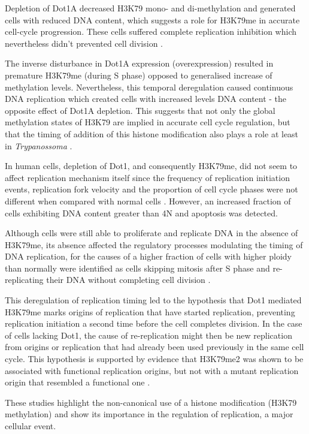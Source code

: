 \documentclass[11pt,twoside,a4paper]{report}
\begin{document}
		Depletion of Dot1A decreased H3K79 mono- and di-methylation and generated cells with reduced DNA content, which suggests a role for H3K79me in accurate cell-cycle progression. These cells suffered complete replication inhibition which nevertheless didn't prevented cell division \cite{Gassen2012}.
		
		The inverse disturbance in Dot1A expression (overexpression) resulted in premature H3K79me (during S phase) opposed to generalised increase of methylation levels. Nevertheless, this temporal deregulation caused continuous DNA replication which created cells with increased levels DNA content - the opposite effect of Dot1A depletion. This suggests that not only the global methylation states of H3K79 are implied in accurate cell cycle regulation, but that the timing of addition of this histone modification also plays a role at least in \textit{Trypanossoma} \cite{Gassen2012}.
		
		In human cells, depletion of Dot1, and consequently H3K79me, did not seem to affect replication mechanism itself since the frequency of replication initiation events, replication fork velocity and the proportion of cell cycle phases were not different when compared with normal cells \cite{Fu2013a}. However, an increased fraction of cells exhibiting DNA content greater than 4N and apoptosis was detected.
		
		Although cells were still able to proliferate and replicate DNA in the absence of H3K79me, its absence affected the regulatory processes modulating the timing of DNA replication, for the causes of a higher fraction of cells with higher ploidy than normally were identified as cells skipping mitosis after S phase and re-replicating their DNA without completing cell division \cite{Fu2013a}.
		
		This deregulation of replication timing led to the hypothesis that Dot1 mediated H3K79me marks origins of replication that have started replication, preventing replication initiation a second time before the cell completes division. In the case of cells lacking Dot1, the cause of re-replication might then be new replication from origins or replication that had already been used previously in the same cell cycle. This hypothesis is supported by evidence that H3K79me2 was shown to be associated with functional replication origins, but not with a mutant replication origin that resembled a functional one \cite{Fu2013a}.
		
		These studies highlight the non-canonical use of a histone modification (H3K79 methylation) and show its importance in the regulation of replication, a major cellular event.
\end{document}
